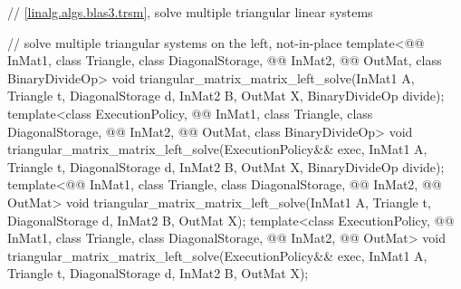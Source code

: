 \begin{codeblock}
{  // \ref{linalg.algs.blas3.trsm}, solve multiple triangular linear systems

  // solve multiple triangular systems on the left, not-in-place
  template<@@ InMat1, class Triangle, class DiagonalStorage,
           @@ InMat2, @@ OutMat, class BinaryDivideOp>
    void triangular_matrix_matrix_left_solve(InMat1 A, Triangle t, DiagonalStorage d,
                                             InMat2 B, OutMat X, BinaryDivideOp divide);
  template<class ExecutionPolicy,
           @@ InMat1, class Triangle, class DiagonalStorage,
           @@ InMat2, @@ OutMat, class BinaryDivideOp>
    void triangular_matrix_matrix_left_solve(ExecutionPolicy&& exec,
                                             InMat1 A, Triangle t, DiagonalStorage d,
                                             InMat2 B, OutMat X, BinaryDivideOp divide);
  template<@@ InMat1, class Triangle, class DiagonalStorage,
           @@ InMat2, @@ OutMat>
    void triangular_matrix_matrix_left_solve(InMat1 A, Triangle t, DiagonalStorage d,
                                             InMat2 B, OutMat X);
  template<class ExecutionPolicy,
           @@ InMat1, class Triangle, class DiagonalStorage,
           @@ InMat2, @@ OutMat>
    void triangular_matrix_matrix_left_solve(ExecutionPolicy&& exec,
                                             InMat1 A, Triangle t, DiagonalStorage d,
                                             InMat2 B, OutMat X);

}
\end{codeblock}

